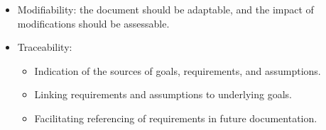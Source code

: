 \begin{itemize}
    \item Modifiability: the document should be adaptable, and the impact of modifications should be assessable.
    \item Traceability: 
        \begin{itemize}
            \item Indication of the sources of goals, requirements, and assumptions.
            \item Linking requirements and assumptions to underlying goals.
            \item Facilitating referencing of requirements in future documentation.
        \end{itemize}
\end{itemize}   